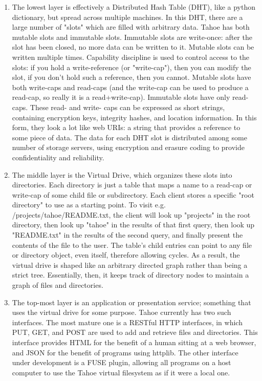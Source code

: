 \documentclass[11pt]{article}
\begin{document}
\begin{enumerate}
\item The lowest layer is effectively a Distributed Hash Table (DHT), 
like a python dictionary, but spread across multiple machines. In this 
DHT, there are a large number of "slots" which are filled with arbitrary 
data. Tahoe has both mutable slots and immutable slots. Immutable slots 
are write-once: after the slot has been closed, no more data can be written 
to it. Mutable slots can be written multiple times. Capability discipline 
is used to control access to the slots: if you hold a write-reference 
(or "write-cap"), then you can modify the slot, if you don't hold such a 
reference, then you cannot. Mutable slots have both write-caps and 
read-caps (and the write-cap can be used to produce a read-cap, so really 
it is a read+write-cap). Immutable slots have only read-caps. These read- 
and write- caps can be expressed as short strings, containing encryption 
keys, integrity hashes, and location information. In this form, they look 
a lot like web URIs: a string that provides a reference to some piece of 
data. The data for each DHT slot is distributed among some number of 
storage servers, using encryption and erasure coding to provide 
confidentiality and reliability. 

\item The middle layer is the Virtual Drive, which organizes these slots 
into directories. Each directory is just a table that maps a name to a 
read-cap or write-cap of some child file or subdirectory. Each client 
stores a specific "root directory" to use as a starting point. To visit 
e.g. /projects/tahoe/README.txt, the client will look up "projects" in 
the root directory, then look up "tahoe" in the results of that first 
query, then look up "README.txt" in the results of the second query, and 
finally present the contents of the file to the user. The table's child 
entries can point to any file or directory object, even itself, therefore 
allowing cycles. As a result, the virtual drive is shaped like an arbitrary 
directed graph rather than being a strict tree. Essentially, then, it keeps  
track of directory nodes to maintain a graph of files and directories. 

\item The top-most layer is an application or presentation service; 
something that uses the virtual drive for some purpose. Tahoe currently 
has two such interfaces. The most mature one is a RESTful HTTP interfaces, 
in which PUT, GET, and POST are used to add and retrieve files and 
directories. This interface provides HTML for the benefit of a human sitting 
at a web browser, and JSON for the benefit of programs using httplib. The 
other interface under development is a FUSE plugin, allowing all programs 
on a host computer to use the Tahoe virtual filesystem as if it were a local 
one. 

\end{enumerate}
\end{document}
